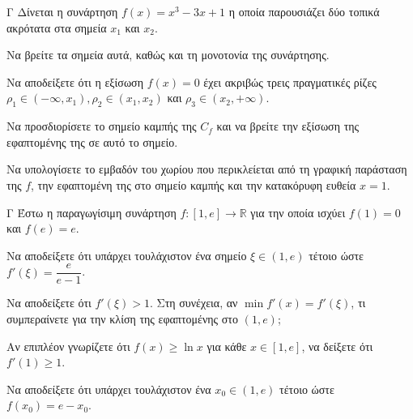 \begin{thema}{Γ}
Δίνεται η συνάρτηση $f(x) = x^3 - 3x + 1$ η οποία παρουσιάζει δύο τοπικά ακρότατα στα σημεία $x_1$ και $x_2$.
\begin{erwthma}
  \item Να βρείτε τα σημεία αυτά, καθώς και τη μονοτονία της συνάρτησης.
  \item Να αποδείξετε ότι η εξίσωση $f(x) = 0$ έχει ακριβώς τρεις πραγματικές ρίζες $\rho_1 \in (-\infty, x_1), \rho_2 \in (x_1, x_2)$ και $\rho_3 \in (x_2, +\infty)$.
  \item Να προσδιορίσετε το σημείο καμπής της $C_f$ και να βρείτε την εξίσωση της εφαπτομένης της σε αυτό το σημείο.
  \item Να υπολογίσετε το εμβαδόν του χωρίου που περικλείεται από τη γραφική παράσταση της $f$, την εφαπτομένη της στο σημείο καμπής και την κατακόρυφη ευθεία $x = 1$.
\end{erwthma}
\end{thema}

\begin{thema}{Γ}
Έστω η παραγωγίσιμη συνάρτηση $f: [1, e] \to \mathbb{R}$ για την οποία ισχύει $f(1)=0$ και $f(e)=e$.
\begin{erwthma}
  \item Να αποδείξετε ότι υπάρχει τουλάχιστον ένα σημείο $\xi \in (1, e)$ τέτοιο ώστε $f'(\xi) = \dfrac{e}{e-1}$.
  \item Να αποδείξετε ότι $f'(\xi) > 1$. Στη συνέχεια, αν $\min f'(x) = f'(\xi)$, τι συμπεραίνετε για την κλίση της εφαπτομένης στο $(1, e)$;
  \item Αν επιπλέον γνωρίζετε ότι $f(x) \ge \ln x$ για κάθε $x \in [1, e]$, να δείξετε ότι $f'(1) \ge 1$.
  \item Να αποδείξετε ότι υπάρχει τουλάχιστον ένα $x_0 \in (1, e)$ τέτοιο ώστε $f(x_0) = e - x_0$.
\end{erwthma}
\end{thema}

